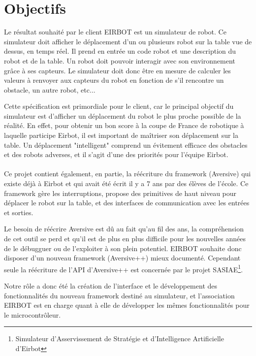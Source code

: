\section{Objectifs}

Le résultat souhaité par le client EIRBOT est un simulateur de robot. Ce simulateur doit afficher le déplacement d'un ou plusieurs robot sur la table vue de dessus, en temps réel. Il prend en entrée un code robot et une description du robot et de la table. Un robot doit pouvoir interagir avec son environnement grâce à ses capteurs. Le simulateur doit donc être en mesure de calculer les valeurs à renvoyer aux capteurs du robot en fonction de s'il rencontre un obstacle, un autre robot, etc...

Cette spécification est primordiale pour le client, car le principal objectif du simulateur est d'afficher un déplacement du robot le plus proche possible de la réalité.
En effet, pour obtenir un bon score à la coupe de France de robotique à laquelle participe Eirbot, il est important de maîtriser son déplacement sur la table. Un déplacement "intelligent" comprend un évitement efficace des obstacles et des robots adverses, et il s'agit d'une des priorités pour l'équipe Eirbot.

\paragraph{}
Ce projet contient également, en partie, la réécriture du framework (Aversive) qui existe déjà à Eirbot et qui avait été écrit il y a 7 ans par des élèves de l'école. Ce framework gère les interruptions, propose des primitives de haut niveau pour déplacer le robot sur la table, et des interfaces de communication avec les entrées et sorties.

Le besoin de réécrire Aversive est dû au fait qu'au fil des ans, la compréhension de cet outil se perd et qu'il est de plus en plus difficile pour les nouvelles années de le débugguer ou de l'exploiter à son plein potentiel.
EIRBOT souhaite donc disposer d'un nouveau framework (Aversive++) mieux documenté. Cependant seule la réécriture de l'API d'Aversive++ est concernée par le projet SASIAE\footnote{Simulateur d'Asservissement de Stratégie et d'Intelligence Artificielle d'Eirbot}. 

Notre rôle a donc été la création de l'interface et le développement des fonctionnalités du nouveau framework destiné au simulateur, et l'association EIRBOT est en charge quant à elle de développer les mêmes fonctionnalités pour le microcontrôleur.

